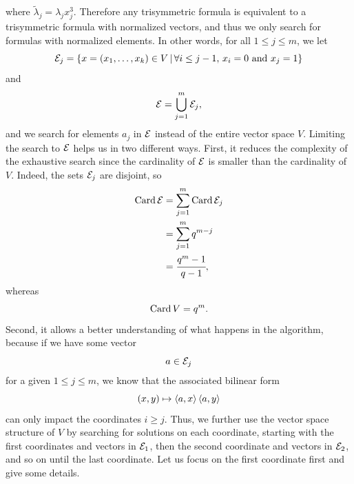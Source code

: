 where $\widetilde\lambda_j = \lambda_jx_j^3$.
Therefore any trisymmetric formula is equivalent to a trisymmetric formula with
normalized vectors, and thus we only search for formulas with normalized
elements. In other words, for all $1\leq j\leq m$, we let
\[
  \mathcal{E}_j=\left\{ x=(x_1, \dots, x_k)\in V
  \,|\, \forall i\leq j-1,\,x_i=0\text{ and }x_j=1 \right\}
\]
and
\[
  \mathcal{E} = \bigcup_{j=1}^m\mathcal{E}_j,
\]
and we search for elements $a_j$ in $\mathcal{E}$ instead of the entire vector space $V$.
Limiting the search to $\mathcal{E}$ helps us in two different ways. First, it reduces
the complexity of the exhaustive search since the cardinality of $\mathcal{E}$ is smaller
than the cardinality of $V$. Indeed, the sets $\mathcal{E}_j$ are disjoint, so
\begin{align*}
  \operatorname{Card}\mathcal{E} &= \sum_{j=1}^m\operatorname{Card}\mathcal{E}_j\\
  &= \sum_{j=1}^m q^{m-j}\\
  &= \cfrac{q^m-1}{q-1},
\end{align*}
whereas
\[
  \operatorname{Card} V = q^m.
\]
Second, it allows a better understanding of what happens in the algorithm,
because if we have some vector
\[
  a\in\mathcal{E}_j
\]
for a given $1\leq j\leq m$, we know that the associated bilinear form
\[
  (x, y)\mapsto\left\langle a,x\right\rangle\left\langle a,y\right\rangle
\]
can only impact the coordinates $i\geq j$. Thus, we further
use the vector space structure of $V$ by searching for solutions
on each coordinate, starting with the first coordinates and vectors in $\mathcal{E}_1$,
then the second coordinate and vectors in $\mathcal{E}_2$, and so on until the last
coordinate. Let us focus on the first coordinate first and give some details.


